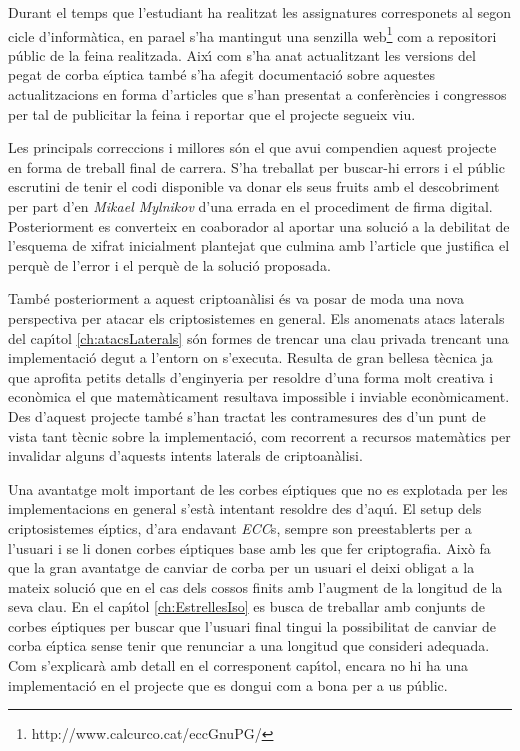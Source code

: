 \documentclass[12pt,twoside,catalan,a4paper]{book}%
\numberwithin{figure}{section}		%
\theoremstyle{definition}   			%
\def\ce{corba e\lgem{}\'{\i}ptica}%
\def\ces{corbes e\lgem{}\'{\i}ptiques}%
\def\cfs{cossos finits}%
\theoremstyle{saltolinea}   			%
\begin{document}
Durant el temps que l'estudiant ha realitzat les assignatures corresponets al segon cicle d'inform\`atica, en para\lgem{}el s'ha mantingut una senzilla web\footnote{http://www.calcurco.cat/eccGnuPG/} com a repositori p\'ublic de la feina realitzada. Aix\'{\i} com s'ha anat actualitzant les versions del pegat de \ce{} tamb\'e s'ha afegit documentaci\'o sobre aquestes actualitzacions en forma d'articles que s'han presentat a confer\`encies i congressos per tal de publicitar la feina i reportar que el projecte segueix viu.

Les principals correccions i millores s\'on el que avui compendien aquest projecte en forma de treball final de carrera. S'ha treballat per buscar-hi errors i el p\'ublic escrutini de tenir el codi disponible va donar els seus fruits amb el descobriment per part d'en \emph{Mikael Mylnikov} d'una errada en el procediment de firma digital. Posteriorment es converteix en co\lgem{}aborador al aportar una soluci\'o a la debilitat de l'esquema de xifrat inicialment plantejat que culmina amb l'article \cite{BM06} que justifica el perqu\`e de l'error i el perqu\`e de la soluci\'o proposada.

Tamb\'e posteriorment a aquest criptoan\`alisi \'es va posar de moda una nova perspectiva per atacar els criptosistemes en general. Els anomenats atacs laterals del cap\'{\i}tol \ref{ch:atacsLaterals} s\'on formes de trencar una clau privada trencant una implementaci\'o degut a l'entorn on s'executa. Resulta de gran bellesa t\`ecnica ja que aprofita petits detalls d'enginyeria per resoldre d'una forma molt creativa i econ\`omica el que matem\`aticament resultava impossible i inviable econ\`omicament. Des d'aquest projecte tamb\'e s'han tractat les contramesures des d'un punt de vista tant t\`ecnic sobre la implementaci\'o, com recorrent a recursos matem\`atics per invalidar alguns d'aquests intents laterals de criptoan\`alisi.

Una avantatge molt important de les \ces{} que no es explotada per les implementacions en general s'est\`a intentant resoldre des d'aqu\'{\i}. El setup dels criptosistemes e\lgem{}\'{\i}ptics, d'ara endavant  \emph{ECC}s, sempre son preestablerts per a l'usuari i se li donen \ces{} base amb les que fer criptografia. Aix\`o fa que la gran avantatge de canviar de corba per un usuari el deixi obligat a la mateix soluci\'o que en el cas dels \cfs{} amb l'augment de la longitud de la seva clau. En el cap\'{\i}tol \ref{ch:EstrellesIso} es busca de treballar amb conjunts de \ces{} per buscar que l'usuari final tingui la possibilitat de canviar de \ce{} sense tenir que renunciar a una longitud que consideri adequada. Com s'explicar\`a amb detall en el corresponent cap\'{\i}tol, encara no hi ha una implementaci\'o en el projecte que es dongui com a bona per a us p\'ublic.
\end{document}
